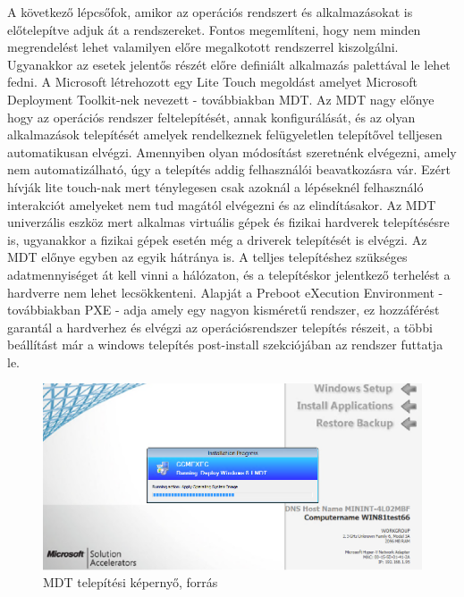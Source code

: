 \documentclass[12pt,oneside,justify,table]{book}
\begin{document}
A következő lépcsőfok, amikor az operációs rendszert és alkalmazásokat is előtelepítve adjuk át a rendszereket. Fontos megemlíteni, hogy nem minden megrendelést lehet valamilyen előre megalkotott rendszerrel kiszolgálni. Ugyanakkor az esetek jelentős részét előre definiált alkalmazás palettával le lehet fedni. A Microsoft létrehozott egy Lite Touch megoldást amelyet Microsoft Deployment Toolkit-nek nevezett - továbbiakban MDT. Az MDT nagy előnye hogy az operációs rendszer feltelepítését, annak konfigurálását, és az olyan alkalmazások telepítését amelyek rendelkeznek felügyeletlen telepítővel telljesen automatikusan elvégzi. Amennyiben olyan módosítást szeretnénk elvégezni, amely nem automatizálható, úgy a telepítés addig felhasználói beavatkozásra vár. Ezért hívják lite touch-nak mert ténylegesen csak azoknál a lépéseknél felhasználó interakciót amelyeket nem tud magától elvégezni és az elindításakor. Az MDT univerzális eszköz mert alkalmas virtuális gépek és fizikai hardverek telepítésésre is, ugyanakkor a fizikai gépek esetén még a driverek telepítését is elvégzi. Az MDT előnye egyben az egyik hátránya is. A telljes telepítéshez szükséges adatmennyiséget át kell vinni a hálózaton, és a telepítéskor jelentkező terhelést a hardverre nem lehet lecsökkenteni. Alapját a Preboot eXecution Environment - továbbiakban PXE - adja amely egy nagyon kisméretű rendszer, ez hozzáférést garantál a hardverhez és elvégzi az operációsrendszer telepítés részeit, a többi beállítást már a windows telepítés post-install szekciójában az rendszer futtatja le.  \\
\begin{figure}[ht]
\centering
\includegraphics[width=1\textwidth]{mdt.png}
\caption{MDT telepítési képernyő, forrás \cite{MDTImage}}
\label{fig:mdt_image}
\end{figure}
\end{document}
